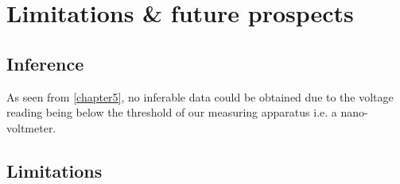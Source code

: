\chapter{Limitations \& future prospects}

\label{chapter6}

\section{Inference}

As seen from \cref{chapter5}, no inferable data could be obtained due to the voltage reading being below the threshold of our measuring apparatus i.e. a nano-voltmeter.

\section{Limitations}

